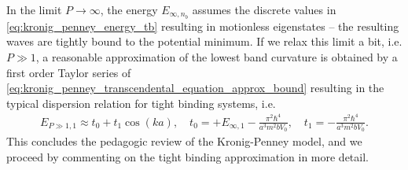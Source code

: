 In the limit $P\rightarrow\infty$, the energy $E_{\infty,n_b}$ assumes the discrete values in \cref{eq:kronig_penney_energy_tb} resulting in motionless eigenstates -- the resulting waves are tightly bound to the potential minimum.
If we relax this limit a bit, i.e. $P\gg 1$, a reasonable approximation of the lowest band curvature is obtained by a first order Taylor series of \cref{eq:kronig_penney_transcendental_equation_approx_bound} resulting in the typical dispersion relation for tight binding systems, i.e.
\begin{align}
    E_{P\gg1,1}\approx t_0 + t_1 \cos(k a),
    \quad
    t_0 = + E_{\infty,1} - \frac{\pi^2 \hbar^4}{a^3 m^2 b V_0},
    \quad
    t_1 = -\frac{\pi^2\hbar^4}{a^3 m^2 bV_0}.
    \label{eq:kronig_penney_tight_binding_dispersion}
\end{align}
This concludes the pedagogic review of the Kronig-Penney model, and we proceed by commenting on the tight binding approximation in more detail.

